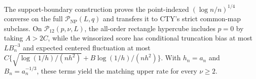 The support-boundary construction proves the point-indexed \((\log n/n)^{1/4}\) converse on the full \(\mathcal P_{\mathrm{NP}}(L,q)\) and transfers it to CTY's strict common-map subclass.  On \(\mathcal P_{12}(p,\nu,L)\), the all-order rectangle hypercube includes \(p=0\) by taking \(A>2C\), while the winsorized score has conditional truncation bias at most \(LB_n^{-3}\) and expected centered fluctuation at most \(C\{\sqrt{\log(1/h)/(nh^2)}+B\log(1/h)/(nh^2)\}\).  With \(h_n=a_n\) and \(B_n=a_n^{-1/3}\), these terms yield the matching upper rate for every \(\nu\geq2\).